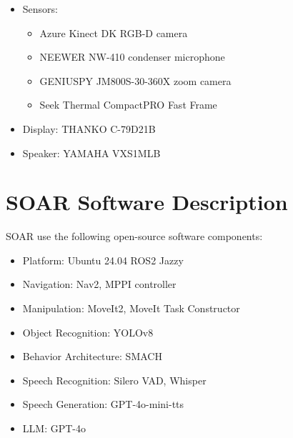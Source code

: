 \begin{itemize}
	      \begin{itemize}
		      \item Sensors:
		            \begin{itemize}
			            \item Azure Kinect DK RGB-D camera
			            \item NEEWER NW-410 condenser microphone
			            \item GENIUSPY JM800S-30-360X zoom camera
			            \item Seek Thermal CompactPRO Fast Frame
		            \end{itemize}
		      \item Display: THANKO C-79D21B
		      \item Speaker: YAMAHA VXS1MLB
	      \end{itemize}
\end{itemize}

\section*{SOAR Software Description}

SOAR use the following open-source software components:

\begin{itemize}
	\item Platform: Ubuntu 24.04 ROS2 Jazzy
	\item Navigation: Nav2, MPPI controller
	\item Manipulation: MoveIt2, MoveIt Task Constructor
	\item Object Recognition: YOLOv8
	\item Behavior Architecture: SMACH
	\item Speech Recognition: Silero VAD, Whisper
	\item Speech Generation: GPT-4o-mini-tts
	\item LLM: GPT-4o
\end{itemize}

